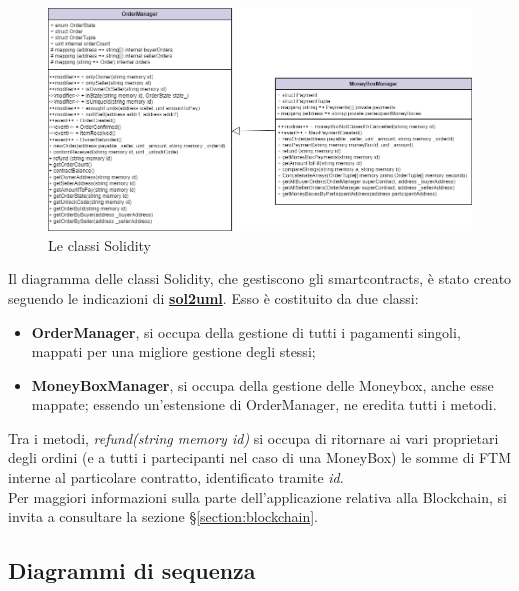 \begin{figure}[H]
    \centering
    \includegraphics[scale = 0.5]{immagini/smartcontract.png}
    \caption{Le classi Solidity}
\end{figure}

Il diagramma delle classi Solidity, che gestiscono gli smartcontracts, è stato creato seguendo le indicazioni di \href{https://github.com/naddison36/sol2uml}{\textbf{sol2uml}}.
Esso è costituito da due classi:
\begin{itemize}
    \item \textbf{OrderManager}, si occupa della gestione di tutti i pagamenti singoli, mappati per una migliore gestione degli stessi;
    \item \textbf{MoneyBoxManager}, si occupa della gestione delle Moneybox, anche esse mappate; essendo un'estensione di OrderManager, ne eredita tutti i metodi.
\end{itemize}

Tra i metodi, \textit{refund(string memory id)} si occupa di ritornare ai vari proprietari degli ordini 
(e a tutti i partecipanti nel caso di una MoneyBox) le somme di FTM interne al particolare contratto, identificato tramite \textit{id}.
\\
Per maggiori informazioni sulla parte dell'applicazione relativa alla Blockchain, si invita a consultare la sezione §\ref{section:blockchain}.



\subsection{Diagrammi di sequenza}

